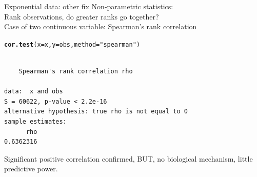 \documentclass[10pt]{beamer}\usepackage[]{graphicx}\usepackage[]{color}
\makeatletter
\newcommand{\hlstr}[1]{\textcolor[rgb]{0.192,0.494,0.8}{#1}}%
\newcommand{\hlstd}[1]{\textcolor[rgb]{0.345,0.345,0.345}{#1}}%
\newcommand{\hlkwc}[1]{\textcolor[rgb]{0.333,0.667,0.333}{#1}}%
\newcommand{\hlkwd}[1]{\textcolor[rgb]{0.737,0.353,0.396}{\textbf{#1}}}%
\newenvironment{kframe}{%
 \def\at@end@of@kframe{}%
 \ifinner\ifhmode%
  \def\at@end@of@kframe{\end{minipage}}%
  \begin{minipage}{\columnwidth}%
 \fi\fi%
 \def\FrameCommand##1{\hskip\@totalleftmargin \hskip-\fboxsep
 \colorbox{shadecolor}{##1}\hskip-\fboxsep
     \hskip-\linewidth \hskip-\@totalleftmargin \hskip\columnwidth}%
 \MakeFramed {\advance\hsize-\width
   \@totalleftmargin\z@ \linewidth\hsize
   \@setminipage}}%
 {\par\unskip\endMakeFramed%
 \at@end@of@kframe}
\newenvironment{knitrout}{}{} %
\makeatother
\begin{document}
\begin{frame}[fragile]{Exponential data: other fix}
Non-parametric statistics:\\ 
Rank observations, do greater ranks go together?\\ \pause
Case of two continuous variable: Spearman's rank correlation
\pause
\begin{knitrout}\small
{}\color{fgcolor}\begin{kframe}
\begin{alltt}
\hlkwd{cor.test}\hlstd{(}\hlkwc{x} \hlstd{= x,} \hlkwc{y} \hlstd{= obs,} \hlkwc{method} \hlstd{=} \hlstr{"spearman"}\hlstd{)}
\end{alltt}
\begin{verbatim}

	Spearman's rank correlation rho

data:  x and obs
S = 60622, p-value < 2.2e-16
alternative hypothesis: true rho is not equal to 0
sample estimates:
      rho 
0.6362316 
\end{verbatim}
\end{kframe}
\end{knitrout}
\pause
Significant positive correlation confirmed, BUT, no biological mechanism, little predictive power.

\end{frame}
% 
% 
% 
% 
% 
%   
\end{document}
